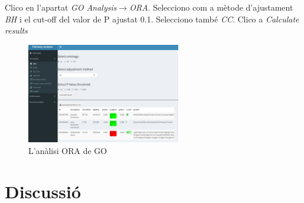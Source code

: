 Clico en l'apartat \textit{GO Analysis}$\rightarrow$\textit{ORA}. Selecciono com a mètode d'ajustament \textit{BH} i el cut-off del valor de P ajustat 0.1. Selecciono també \textit{CC}. Clico a \textit{Calculate results}
\begin{figure}[H]
\centering
\includegraphics[width=0.6\textwidth]{figures/Estudi1_Fig13_GO.png} 
\caption{L'anàlisi ORA de GO}
\end{figure}

\chapter{Discussió}
